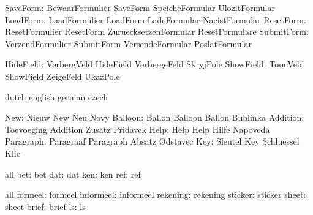           SaveForm:  BewaarFormulier   SaveForm             SpeicheFormular
                     UlozitFormular
          LoadForm:  LaadFormulier     LoadForm             LadeFormular
                     NacistFormular
         ResetForm:  ResetFormulier    ResetForm            ZuruecksetzenFormular
                     ResetFormulare
        SubmitForm:  VerzendFormulier  SubmitForm           VersendeFormular
                     PoslatFormular

         HideField:  VerbergVeld       HideField            VerbergeFeld
                     SkryjPole
         ShowField:  ToonVeld          ShowField            ZeigeFeld
                     UkazPole

\stopvariables


\startvariables      dutch             english              german
                     czech

               New:  Nieuw             New                  Neu
                     Novy
           Balloon:  Ballon            Balloon              Ballon
                     Bublinka
          Addition:  Toevoeging        Addition             Zusatz
                     Pridavek %
              Help:  Help              Help                 Hilfe
                     Napoveda
         Paragraph:  Paragraaf         Paragraph            Absatz
                     Odstavec
               Key:  Sleutel           Key                  Schluessel
                     Klic

\stopvariables




\startconstants       all
                bet:  bet
                dat:  dat
                ken:  ken
                ref:  ref
\stopconstants

\startvariables       all
            formeel:  formeel
          informeel:  informeel
           rekening:  rekening
            sticker:  sticker
              sheet:  sheet
              brief:  brief
                 ls:  ls
\stopvariables


\stoplogginginterface

\endinput
